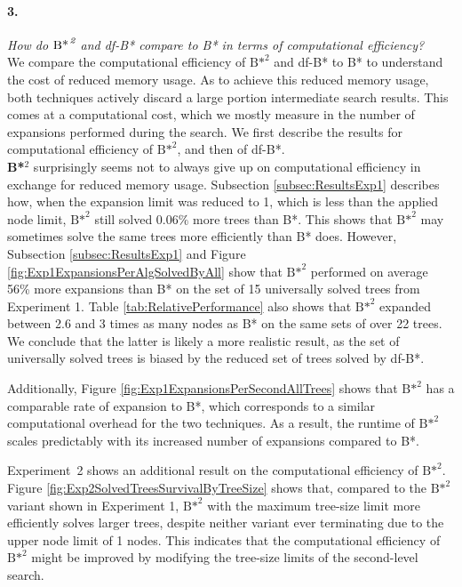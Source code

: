 \paragraph{3.} \textit{How do ${\text{B*}}^{\text{\hspace{1pt}}\textit{2}}$ and df-B* compare to B* in terms of computational efficiency?}\\

\vspace{-1ex}
\noindent We compare the computational efficiency of ${\text{B*}}^2$ and df-B* to B* to understand the cost of reduced memory usage. As to achieve this reduced memory usage, both techniques actively discard a large portion intermediate search results. This comes at a computational cost, which we mostly measure in the number of expansions performed during the search. We first describe the results for computational efficiency of ${\text{B*}}^2$, and then of df-B*.\\

\noindent \textbf{B*}$^2$ surprisingly seems not to always give up on computational efficiency in exchange for reduced memory usage. Subsection \ref{subsec:ResultsExp1} describes how, when the expansion limit was reduced to 1, which is less than the applied node limit, ${\text{B*}}^2$ still solved $0.06\%$ more trees than B*. This shows that ${\text{B*}}^2$ may sometimes solve the same trees more efficiently than B* does. However, Subsection \ref{subsec:ResultsExp1} and Figure \ref{fig:Exp1ExpansionsPerAlgSolvedByAll} show that ${\text{B*}}^2$ performed on average 56\% more expansions than B* on the set of 15 universally solved trees from Experiment 1.
Table \ref{tab:RelativePerformance} also shows that ${\text{B*}^2}$ expanded between 2.6 and 3 times as many nodes as B* on the same sets of over 22 trees. We conclude that the latter is likely a more realistic result, as the set of universally solved trees is biased by the reduced set of trees solved by df-B*.

Additionally, Figure \ref{fig:Exp1ExpansionsPerSecondAllTrees} shows that ${\text{B*}}^2$ has a comparable rate of expansion to B*, which corresponds to a similar computational overhead for the two techniques. As a result, the runtime of ${\text{B*}}^2$ scales predictably with its increased number of expansions compared to B*.

Experiment\ 2 shows an additional result on the computational efficiency of ${\text{B*}}^2$. Figure \ref{fig:Exp2SolvedTreesSurvivalByTreeSize} shows that, compared to the ${\text{B*}}^2$ variant shown in Experiment 1, ${\text{B*}}^2$ with the maximum tree-size limit more efficiently solves larger trees, despite neither variant ever terminating due to the upper node limit of 1 nodes. This indicates that the computational efficiency of ${\text{B*}}^2$ might be improved by modifying the tree-size limits of the second-level search.\\

